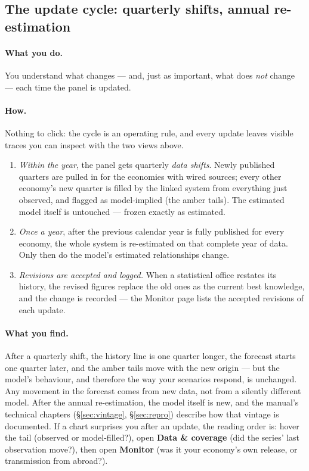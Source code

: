 \documentclass[11pt]{article}
\theoremstyle{definition}
\theoremstyle{remark}
\begin{document}
\subsection{The update cycle: quarterly shifts, annual re-estimation}

\paragraph{What you do.}
You understand what changes --- and, just as important, what does \emph{not}
change --- each time the panel is updated.

\paragraph{How.}
Nothing to click: the cycle is an operating rule, and every update leaves visible
traces you can inspect with the two views above.
\begin{enumerate}
  \item \emph{Within the year}, the panel gets quarterly \emph{data shifts}. Newly
    published quarters are pulled in for the economies with wired sources; every
    other economy's new quarter is filled by the linked system from everything
    just observed, and flagged as model-implied (the amber tails). The estimated
    model itself is untouched --- frozen exactly as estimated.
  \item \emph{Once a year}, after the previous calendar year is fully published
    for every economy, the whole system is re-estimated on that complete year of
    data. Only then do the model's estimated relationships change.
  \item \emph{Revisions are accepted and logged.} When a statistical office
    restates its history, the revised figures replace the old ones as the current
    best knowledge, and the change is recorded --- the Monitor page lists the
    accepted revisions of each update.
\end{enumerate}

\paragraph{What you find.}
After a quarterly shift, the history line is one quarter longer, the forecast
starts one quarter later, and the amber tails move with the new origin --- but the
model's behaviour, and therefore the way your scenarios respond, is unchanged. Any
movement in the forecast comes from new data, not from a silently different model.
After the annual re-estimation, the model itself is new, and the manual's technical
chapters (\S\ref{sec:vintage}, \S\ref{sec:repro}) describe how that vintage is
documented. If a chart surprises you after an update, the reading order is: hover
the tail (observed or model-filled?), open \textbf{Data \& coverage}
(did the series' last observation move?), then open \textbf{Monitor} (was it your
economy's own release, or transmission from abroad?).
\end{document}

